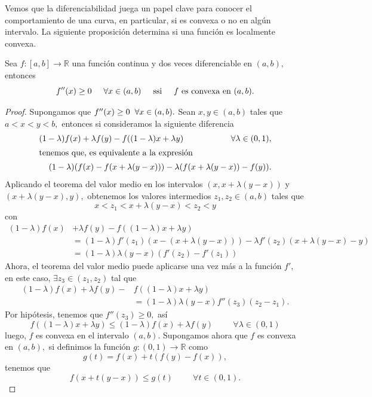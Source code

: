 Vemos que la diferenciabilidad juega un papel clave para conocer el comportamiento de una curva, en particular, si es convexa o no en algún intervalo. La siguiente proposición determina si una función es localmente convexa.
\begin{proposition}
	Sea $f:[a,b] \rightarrow \mathbb{R}$ una función continua y dos veces diferenciable en $(a,b),$ entonces $$f''(x) \geq 0 \hspace{0.5cm} \forall x \in (a,b) \hspace{0.5cm} \textrm{ssi}\hspace{0.5cm} f\  \textrm{es convexa en}\ (a,b).$$
\end{proposition}
\begin{proof}
	Supongamos que $f''(x) \geq 0\hspace{0.2 cm} \forall x \in (a,b).$ Sean $x,y \in (a,b)$ tales que $a<x<y<b,$ entonces si consideramos la siguiente diferencia
	\begin{align*}
	(1-\lambda)f(x)+\lambda f(y)-f((1-\lambda)x+\lambda y) \hspace{2cm} \forall \lambda \in (0,1),\\
	\intertext{tenemos que, es equivalente a la expresión}
	(1-\lambda)(f(x)-f(x+\lambda (y-x)))-\lambda (f(x+\lambda (y-x))-f(y)).
	\end{align*}
	Aplicando el teorema del valor medio en los intervalos $(x,x+\lambda (y-x))$ y $(x+\lambda (y-x),y),$ obtenemos los valores intermedios $z_1, z_2 \in (a,b)$ tales que $$x<z_1<x+\lambda (y-x)<z_2<y$$
	con
	\begin{align*}
	(1-\lambda)f(x)&+\lambda f(y)-f((1-\lambda)x+\lambda y)\\
	&= (1-\lambda)f'(z_1)(x-(x+\lambda (y-x)))-\lambda f'(z_2)(x+\lambda (y-x)-y)\\
	&= (1-\lambda)\lambda (y-x)(f'(z_2)-f'(z_1)) 
	\end{align*}
	Ahora, el teorema del valor medio puede aplicarse una vez más a la función $f',$ en este caso, $\exists z_3 \in (z_1,z_2)$ tal que
	\begin{align*}
	(1-\lambda)f(x)+\lambda f(y)-&f((1-\lambda)x+\lambda y)\\
	&= (1-\lambda)\lambda (y-x)f''(z_3)(z_2-z_1).
	\end{align*}
	Por hipótesis, tenemos que $f''(z_3) \geq 0,$ así $$f((1-\lambda)x+\lambda y) \leq (1-\lambda)f(x)+\lambda f(y)\hspace{1cm}\forall \lambda \in (0,1)$$ luego, $f$ es convexa en el intervalo $(a,b).$
	Supongamos ahora que $f$ es convexa en $(a,b),$ si definimos la función $g: (0,1) \rightarrow \mathbb{R}$ como $$g(t) = f(x)+t(f(y)-f(x)),$$ tenemos que $$f(x+t(y-x)) \leq g(t) \hspace{1cm} \forall t \in (0,1).$$

\end{proof}
